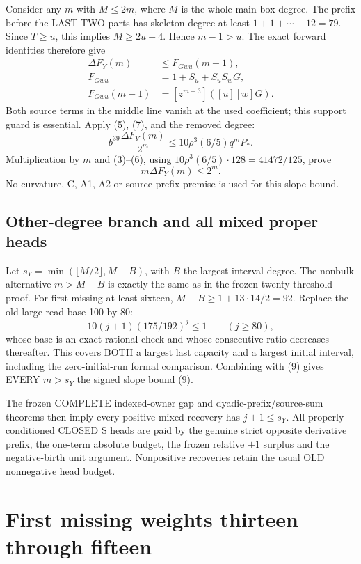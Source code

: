 \documentclass[11pt]{article}
\begin{document}
Consider any $m$ with $M\le2m$, where $M$ is the whole main-box degree.
The prefix before the LAST TWO parts has skeleton degree at least
$1+1+\cdots+12=79$. Since $T\ge u$, this implies $M\ge2u+4$.
Hence $m-1>u$. The exact forward identities therefore give
\[
 \begin{split}
 \Delta F_Y(m)&\le F_{Gwu}(m-1),\\
 F_{Gwu}&=1+S_u+S_uS_wG,\\
 F_{Gwu}(m-1)&=[z^{m-3}]([u][w]G).
 \end{split}                                                    \tag{8}
\]
Both source terms in the middle line vanish at the used coefficient;
this support guard is essential. Apply (5), (7), and the removed degree:
\[
 b^{39}\frac{\Delta F_Y(m)}{2^m}
     \le10\rho^3(6/5)q^m P_*.
\]
Multiplication by $m$ and (3)--(6), using
$10\rho^3(6/5)\cdot128=41472/125$, prove
\[
                          m\Delta F_Y(m)\le2^m.       \tag{9}
\]
No curvature, C, A1, A2 or source-prefix premise is used for this slope bound.

\subsection{Other-degree branch and all mixed proper heads}
Let $s_Y=\min(\lfloor M/2\rfloor,M-B)$, with $B$ the largest interval
degree. The nonbulk alternative $m>M-B$ is exactly the same as in the
frozen twenty-threshold proof. For first missing at least sixteen,
$M-B\ge1+13\cdot14/2=92$. Replace the old large-read base 100 by 80:
\[
                10(j+1)(175/192)^j\le1\qquad(j\ge80),
\]
whose base is an exact rational check and whose consecutive ratio
decreases thereafter. This covers BOTH a largest last capacity and a
largest initial interval, including the zero-initial-run formal comparison.
Combining with (9) gives EVERY $m>s_Y$ the signed slope bound (9).

The frozen COMPLETE indexed-owner gap and dyadic-prefix/source-sum
theorems then imply every positive mixed recovery has $j+1\le s_Y$.
All properly conditioned CLOSED S heads are paid by the genuine strict
opposite derivative prefix, the one-term absolute budget, the frozen
relative $+1$ surplus and the negative-birth unit argument. Nonpositive
recoveries retain the usual OLD nonnegative head budget.

\section{First missing weights thirteen through fifteen}
\end{document}
